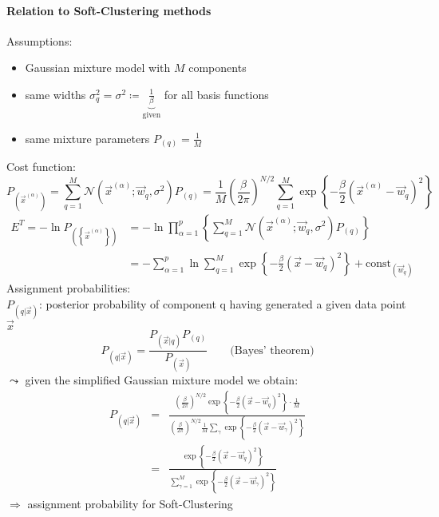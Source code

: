 \paragraph{Relation to Soft-Clustering methods}
\small
Assumptions:
\begin{itemize}
	\item Gaussian mixture model with $M$ components
	\item same widths $\sigma_q^2 = \sigma^2 \coloneqq \underbrace{\frac{1}{\beta}}_{\text{given}}$ for all basis functions
	\item same mixture parameters $P_{(q)} = \frac{1}{M}$
\end{itemize}
\vspace{0.2cm}
Cost function: 
\begin{equation}
P_{(\vec{x}^{(\alpha)})} = \sum_{q=1}^{M} \mathcal{N}\left( \vec{x}^{(\alpha)}; \vec{w}_q, \sigma^2 \right) P_{(q)} = \frac{1}{M}\left(\frac{\beta}{2\pi}\right)^{N/2} \sum_{q=1}^{M} \exp \left\{ - \frac{\beta}{2} \left( \vec{x}^{(\alpha)} - \vec{w}_q \right)^2 \right\} 
\end{equation}
\vspace{-2mm}
\begin{align}
E^T = - \ln P_{\left( \left\{ \vec{x}^{(\alpha)} \right\} \right)} &= -\ln \prod_{\alpha=1}^{p} \left\{ \sum_{q=1}^{M} \mathcal{N}\left( \vec{x}^{(\alpha)}; \vec{w}_q, \sigma^2 \right) P_{(q)} \right\} 
\\&= - \sum_{\alpha=1}^{p} \ln \sum_{q=1}^{M} \exp \left\{ - \frac{\beta}{2} \left( \vec{x} - \vec{w}_q \right)^2 \right\} + \text{const}_{(\vec{w}_q)}
\end{align}
Assignment probabilities:\\\vspace{3mm}
$P_{(q | \vec{x})}$: posterior probability of component q having generated a given data point $\vec{x}$
\begin{equation}
P_{(q | \vec{x})} = \frac{P_{(\vec{x} | q)} P_{(q)}}{P_{(\vec{x})}} \qquad \text{(Bayes' theorem)}
\end{equation}
$\leadsto$ given the simplified Gaussian mixture model we obtain:
\begin{eqnarray}
P_{(q | \vec{x})} &=& \frac{\left( \frac{\beta}{2\pi} \right)^{N/2} \exp \left\{ - \frac{\beta}{2} \left( \vec{x} - \vec{w}_q \right)^2 \right\} \cdot \frac{1}{M}}{\left( \frac{\beta}{2\pi} \right)^{N/2} \frac{1}{M} \sum_{\gamma}^{} \exp \left\{ - \frac{\beta}{2} \left( \vec{x} - \vec{w}_{\gamma} \right)^2 \right\}} \\
&=& \frac{\exp \left\{ - \frac{\beta}{2} \left( \vec{x} - \vec{w}_q \right)^2 \right\}}{ \sum_{\gamma=1}^{M} \exp \left\{ - \frac{\beta}{2} \left( \vec{x} - \vec{w}_{\gamma} \right)^2 \right\}}
\end{eqnarray}
$\Rightarrow$ assignment probability for Soft-Clustering

